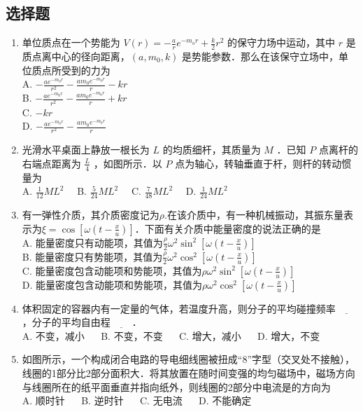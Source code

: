 
\subsection{选择题}
\begin{enumerate}
\item 单位质点在一个势能为 $V(r) = -\frac{a}{r}e^{-m_{o}r}+\frac{k}{2}r^{2}$ 的保守力场中运动，其中 $r$ 是质点离中心的径向距离，$(a,m_{0},k)$ 是势能参数．那么在该保守立场中，单位质点所受到的力为\\
A. $-\frac{ae^{-m_{0}r}}{r^{2}}-\frac{am_{0}e^{-m_{0}r}}{r}-kr$\\
B. $-\frac{ae^{-m_{0}r}}{r^{2}}-\frac{am_{0}e^{-m_{0}r}}{r}+kr$\\
C. $-kr$\\
D. $-\frac{ae^{-m_{0}r}}{r^{2}}-\frac{am_{0}e^{-m_{0}r}}{r}$\\

\item 光滑水平桌面上静放一根长为 $L$ 的均质细杆，其质量为 $M$ ．已知 $P$ 点离杆的右端点距离为 $\frac{L}{4}$ ，如图所示．以 $P$ 点为轴心，转轴垂直于杆，则杆的转动惯量为\\
A. $\frac{1}{12}ML^{2} \quad$
B. $\frac{5}{24}ML^{2} \quad$
C. $\frac{7}{48}ML^{2} \quad$
D. $\frac{1}{24}ML^{2} \quad$

\item 有一弹性介质，其介质密度记为$\rho$.在该介质中，有一种机械振动，其振东量表示为$\xi = \cos{[\omega(t-\frac{x}{u})]}$．下面有关介质中能量密度的说法正确的是\\
A. 能量密度只有动能项，其值为$\frac{\rho}{2}\omega^{2}\sin^{2}{[\omega(t-\frac{x}{u})]}$\\
B. 能量密度只有势能项，其值为$\frac{\rho}{2}\omega^{2}\cos^{2}{[\omega(t-\frac{x}{u})]}$\\
C. 能量密度包含动能项和势能项，其值为$\rho\omega^{2}\sin^{2}{[\omega(t-\frac{x}{u})]}$\\
D. 能量密度包含动能项和势能项，其值为$\rho\omega^{2}\cos^{2}{[\omega(t-\frac{x}{u})]}$\\

\item 体积固定的容器内有一定量的气体，若温度升高，则分子的平均碰撞频率$\underline{~~~~~~~~~~}$，分子的平均自由程$\underline{~~~~~~~~~~}$．\\
A. 不变，减小 $\quad$
B. 不变，不变 $\quad$
C. 增大，减小 $\quad$
D. 增大，不变 $\quad$

\item 如图所示，一个构成闭合电路的导电细线圈被扭成“8”字型（交叉处不接触），线圈的1部分比2部分面积大．将其放置在随时间变强的均匀磁场中，磁场方向与线圈所在的纸平面垂直并指向纸外，则线圈的2部分中电流是的方向为\\
A. 顺时针 $\quad$
B. 逆时针 $\quad$
C. 无电流 $\quad$
D. 不能确定 $\quad$


\end{enumerate}
